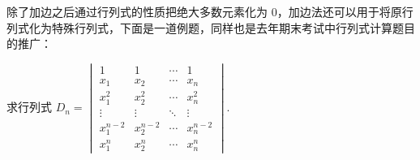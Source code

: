 除了加边之后通过行列式的性质把绝大多数元素化为 $0$，加边法还可以用于将原行列式化为特殊行列式，下面是一道例题，同样也是去年期末考试中行列式计算题目的推广：

\begin{example}{}{}
    求行列式 $D_n=\begin{vmatrix}
            1         & 1         & \cdots & 1         \\
            x_1       & x_2       & \cdots & x_n       \\
            x_1^{2}   & x_2^{2}   & \cdots & x_n^{2}   \\
            \vdots    & \vdots    & \ddots & \vdots    \\
            x_1^{n-2} & x_2^{n-2} & \cdots & x_n^{n-2} \\
            x_1^{n}   & x_2^{n}   & \cdots & x_n^{n}
        \end{vmatrix}$.
\end{example}

